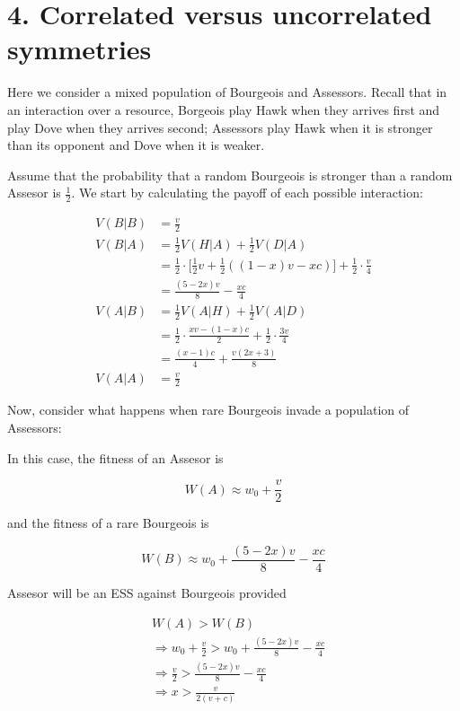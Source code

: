 \documentclass{article}
\begin{document}
\section*{4. Correlated versus uncorrelated symmetries}

Here we consider a mixed population of Bourgeois and Assessors. Recall
that in an interaction over a resource, Borgeois play Hawk when they
arrives first and play Dove when they arrives second; Assessors play
Hawk when it is stronger than its opponent and Dove when it is weaker.

Assume that the probability that a random Bourgeois is stronger than a
random Assesor is $\frac{1}{2}$. We start by calculating the payoff of
each possible interaction:

\begin{align*}
    V(B|B) &= \frac{v}{2} \\
    V(B|A) &= \frac{1}{2} V(H|A) + \frac{1}{2} V(D|A) \\
           &= \frac{1}{2} \cdot \Big[\frac{1}{2} v + \frac{1}{2}((1 - x) v - x c)\Big]
              + \frac{1}{2} \cdot \frac{v}{4} \\
           &= \frac{(5 - 2 x) v}{8} - \frac{x c}{4} \\
    V(A|B) &= \frac{1}{2} V(A|H) + \frac{1}{2} V(A|D) \\
           &= \frac{1}{2} \cdot \frac{x v - (1 - x) c}{2}
              + \frac{1}{2} \cdot \frac{3 v}{4} \\
           &= \frac{(x - 1) c}{4} + \frac{v (2 x + 3)}{8} \\
    V(A|A) &= \frac{v}{2}
\end{align*}

Now, consider what happens when rare Bourgeois invade a population of
Assessors:

In this case, the fitness of an Assesor is

\begin{equation*}
    W(A) \approx w_0 + \frac{v}{2}
\end{equation*}

and the fitness of a rare Bourgeois is

\begin{equation*}
    W(B) \approx w_0 + \frac{(5 - 2 x) v}{8} - \frac{x c}{4}
\end{equation*}

Assesor will be an ESS against Bourgeois provided

\begin{align*}
    &W(A) > W(B) \\
    &\Rightarrow w_0 + \frac{v}{2} > w_0 + \frac{(5 - 2 x) v}{8} - \frac{x c}{4} \\
    &\Rightarrow \frac{v}{2} > \frac{(5 - 2 x) v}{8} - \frac{x c}{4} \\
    &\Rightarrow x > \frac{v}{2(v + c)}
\end{align*}
\end{document}
